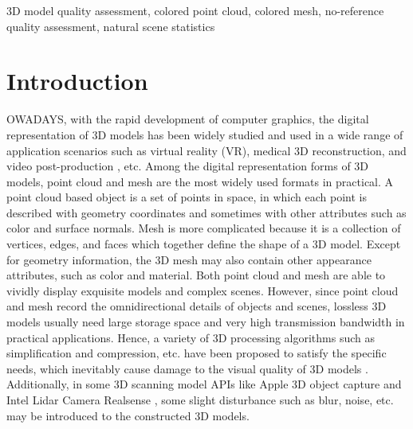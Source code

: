 \documentclass[lettersize,journal]{IEEEtran}
\begin{document}
\begin{IEEEkeywords}
3D model quality assessment, colored point cloud, colored mesh, no-reference quality assessment, natural scene statistics 
\end{IEEEkeywords}







\section{Introduction}\label{sec:introduction}
OWADAYS, with the rapid development of computer graphics, the digital representation of 3D models has been widely studied and used in a wide range of application scenarios such as virtual reality (VR), medical 3D reconstruction, and video post-production \cite{application}, etc. Among the digital representation forms of 3D models, point cloud and mesh are the most widely used formats in practical. A point cloud based object is a set of points in space, in which each point is described with geometry coordinates and sometimes with other attributes such as color and surface normals. Mesh is more complicated because it is a collection of vertices, edges, and faces which together define the shape of a 3D model. Except for geometry information, the 3D mesh may also contain other appearance attributes, such as color and material. Both point cloud and mesh are able to vividly display exquisite models and complex scenes. However, since point cloud and mesh record the omnidirectional details of objects and scenes, lossless 3D models usually need large storage space and very high transmission bandwidth in practical applications. 
Hence, a variety of 3D processing algorithms such as simplification and compression, etc. have been proposed to satisfy the specific needs, which inevitably cause damage to the visual quality of 3D models \cite{li2020occupancy,mekuria2016design}. Additionally, in some 3D scanning model APIs like Apple 3D object capture \cite{apple} and Intel Lidar Camera Realsense \cite{intel}, some slight disturbance such as blur, noise, etc. may be introduced to the constructed 3D models. 
\end{document}
